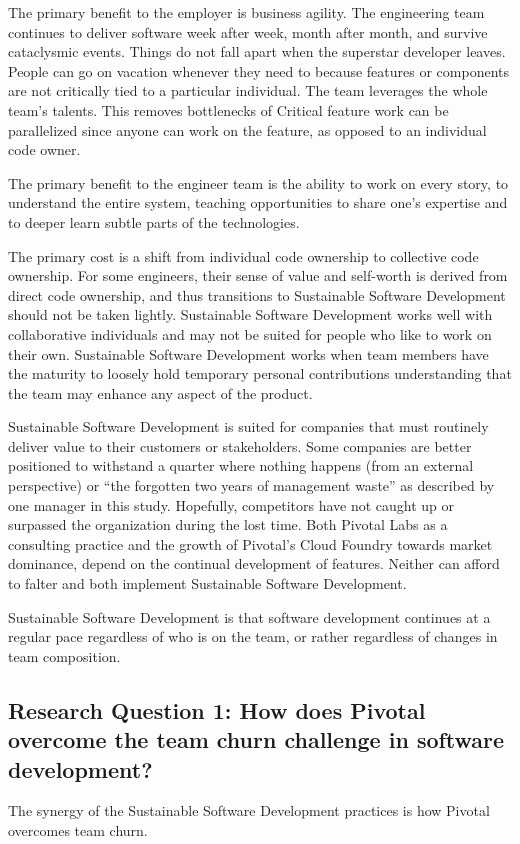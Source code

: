 The primary benefit to the employer is business agility. The engineering team continues to deliver software week after week, month after month, and survive cataclysmic events. Things do not fall apart when the superstar developer leaves. People can go on vacation whenever they need to because features or components are not critically tied to a particular individual. The team leverages the whole team's talents. This removes bottlenecks of  Critical feature work can be parallelized since anyone can work on the feature, as opposed to an individual code owner. 

The primary benefit to the engineer team is the ability to work on every story, to understand the entire system, teaching opportunities to share one's expertise and to deeper learn subtle parts of the technologies. 

The primary cost is a shift from individual code ownership to collective code ownership. For some engineers, their sense of value and self-worth is derived from direct code ownership, and thus transitions to Sustainable Software Development should not be taken lightly. Sustainable Software Development works well with collaborative individuals and may not be suited for people who like to work on their own. Sustainable Software Development works when team members have the maturity to loosely hold temporary personal contributions understanding that the team may enhance any aspect of the product.

Sustainable Software Development is suited for companies that must routinely deliver value to their customers or stakeholders. Some companies are better positioned to withstand a quarter where nothing happens (from an external perspective) or  ``the forgotten two years of management waste” as described by one manager in this study. Hopefully, competitors have not caught up or surpassed the organization during the lost time. Both Pivotal Labs as a consulting practice and the growth of Pivotal's Cloud Foundry towards market dominance, depend on the continual development of features. Neither can afford to falter and both implement Sustainable Software Development.

Sustainable Software Development is that software development continues at a regular pace regardless of who is on the team, or rather regardless of changes in team composition.

\subsection{Research Question 1: How does Pivotal overcome the team churn challenge in software development?}
The synergy of the Sustainable Software Development practices is how Pivotal overcomes team churn.

